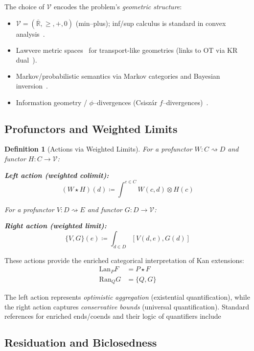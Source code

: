 \documentclass[11pt]{article}
\numberwithin{equation}{section}
\theoremstyle{upright}
\newtheorem{definition}{Definition}
\newcommand{\V}{\mathcal{V}}
\newcommand{\Lan}{\mathrm{Lan}}
\newcommand{\Ran}{\mathrm{Ran}}
\newcommand{\profto}{\rightsquigarrow}
\begin{document}
The choice of $\V$ encodes the problem's \emph{geometric structure}:
\begin{itemize}[itemsep=0.5ex]
\item $\V=(\overline{\mathbb R},\ge,+,0)$ (min–plus); inf/sup calculus is standard in convex analysis~\citep{RockafellarWets1998}.
\item Lawvere metric spaces~\citep{Lawvere1973} for transport-like geometries (links to OT via KR dual~\citep{Villani2009}).
\item Markov/probabilistic semantics via Markov categories and Bayesian inversion~\citep{Fritz2020Markov}.
\item Information geometry / $\phi$–divergences (Csisz{\'a}r $f$–divergences)~\citep{Csiszar1967}.
\end{itemize}

\subsection{Profunctors and Weighted Limits}

\begin{definition}[Actions via Weighted Limits]
For a profunctor $W: C \profto D$ and functor $H: C \to \V$:

\textbf{Left action (weighted colimit):}
\begin{equation}
(W \star H)(d) \coloneqq \int^{c \in C} W(c,d) \otimes H(c)
\end{equation}

For a profunctor $V: D \profto E$ and functor $G: D \to \V$:

\textbf{Right action (weighted limit):}
\begin{equation}
\{V, G\}(e) \coloneqq \int_{d \in D} [V(d,e), G(d)]
\end{equation}
\end{definition}

These actions provide the enriched categorical interpretation of Kan extensions:
\begin{align}
\Lan_{P} F &= P \star F \\
\Ran_{Q} G &= \{Q, G\}
\end{align}

The left action represents \emph{optimistic aggregation} (existential quantification), while the right action captures \emph{conservative bounds} (universal quantification). Standard references for enriched ends/coends and their logic of quantifiers include~\cite{Kelly1982}

\subsection{Residuation and Biclosedness}
\end{document}
